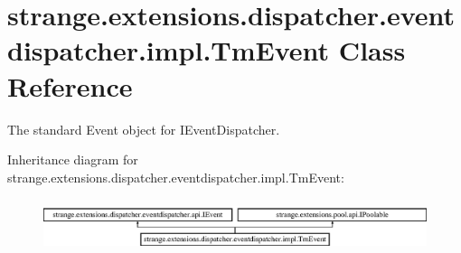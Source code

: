 \hypertarget{classstrange_1_1extensions_1_1dispatcher_1_1eventdispatcher_1_1impl_1_1_tm_event}{\section{strange.\-extensions.\-dispatcher.\-eventdispatcher.\-impl.\-Tm\-Event Class Reference}
\label{classstrange_1_1extensions_1_1dispatcher_1_1eventdispatcher_1_1impl_1_1_tm_event}
}


The standard Event object for I\-Event\-Dispatcher.  


Inheritance diagram for strange.\-extensions.\-dispatcher.\-eventdispatcher.\-impl.\-Tm\-Event\-:\begin{figure}[H]
\begin{center}
\leavevmode
\includegraphics[height=1.555556cm]{classstrange_1_1extensions_1_1dispatcher_1_1eventdispatcher_1_1impl_1_1_tm_event}
\end{center}
\end{figure}
